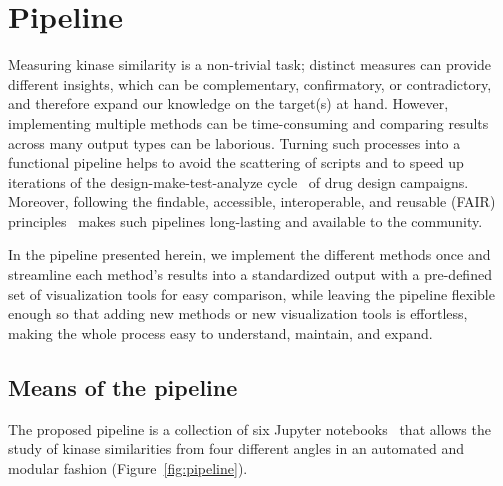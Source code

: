 \documentclass[9pt,training]{livecoms}
\begin{document}
\section{Pipeline}
Measuring kinase similarity is a non-trivial task; distinct measures can provide different insights, which can be complementary, confirmatory, or contradictory, and therefore expand our knowledge on the target(s) at hand. 
However, implementing multiple methods can be time-consuming and comparing results across many output types can be laborious.
Turning such processes into a functional pipeline helps to avoid the scattering of scripts and to speed up iterations of the design-make-test-analyze cycle~\cite{Schneider_2019_NatRevDrugDiscov} of drug design campaigns. Moreover, following the findable, accessible,
interoperable, and reusable (FAIR) principles~\cite{Wilkinson_2016_SciData} makes such pipelines long-lasting and available to the community.

In the pipeline presented herein, we implement the different methods once and streamline each method's results into a standardized output with a pre-defined set of visualization tools for easy comparison, while leaving the pipeline flexible enough so that adding new methods or new visualization tools is effortless, making the whole process easy to understand, maintain, and expand.

\subsection{Means of the pipeline}
The proposed pipeline is a collection of six Jupyter notebooks~\cite{Kluyver_2016_Jupyter} that allows the study of kinase similarities from four different angles in an automated and modular fashion (Figure~\ref{fig:pipeline}).
\end{document}

